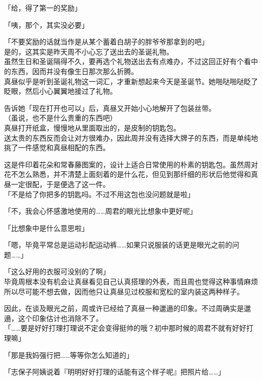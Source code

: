 「给，得了第一的奖励」

「咦，那个，其实没必要」

「不要奖励的话就当作是从某个蓄着白胡子的胖爷爷那拿到的吧」\\

是的，这其实是昨天周不小心忘了送出去的圣诞礼物。\\

虽然生日和圣诞隔得不久，要再选个礼物送出去有点难办，不过这回正好有个看中的东西，因而并没有像生日那次那么折腾。\\

真昼似乎是听到圣诞礼物这一词汇，才重新想起来今天是圣诞节。她啪哒啪哒眨了眨眼，然后小心翼翼地接过了礼物。

告诉她「现在打开也可以」后，真昼又开始小心地解开了包装丝带。\\

（虽说，也不是什么贵重的东西吧）\\

真昼打开纸盒，慢慢地从里面取出的，是皮制的钥匙包。\\

送太贵的东西反而会让对方很难办，因此周并没有选择大牌子的东西，而是单纯地挑了一件感觉和真昼相配的东西。

这是件印着花朵和常春藤图案的，设计上适合日常使用的朴素的钥匙包。虽然周对花不怎么熟悉，并不清楚上面刻着的是什么花，但见到那纤细的形状后他觉得和真昼一定很配，于是便选了这一件。\\

「不是给了你把多的钥匙吗。不过不用这包也没问题就是啦」

「不，我会心怀感激地使用的……周君的眼光比想象中更好呢」

「比想象中是什么意思啦」

「嗯，毕竟平常总是运动衫配运动裤……如果只说服装的话更是眼光之前的问题……」

「这么好用的衣服可没别的了啊」\\

毕竟周根本没有机会让真昼看见自己认真搭理的外表，而且周也觉得这种事情麻烦所以尽可能不想去做，因而他只让真昼见过校服和宽松的室内装这两种样子。

因此，在谈及眼光之前，周或许已经给了真昼一种邋遢的印象。不过周确实是邋遢，这个印象估计也消除不了。\\

「……要是好好打理打理说不定会变得挺帅的哦？初中那时候的周君不就有好好打理嘛」

「那是我妈强行把……等等你怎么知道的」

「志保子阿姨说着『明明好好打理的话能有这个样子呢』把照片给……」

